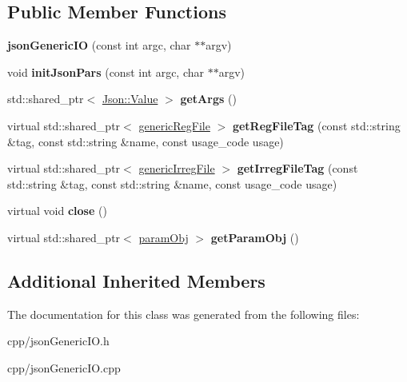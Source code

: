 \subsection*{Public Member Functions}
\begin{DoxyCompactItemize}
\item 
\mbox{\label{class_s_e_p_1_1json_generic_i_o_a7986e645bea6c00934af6705dee61dff}} 
{\bfseries json\+Generic\+IO} (const int argc, char $\ast$$\ast$argv)
\item 
\mbox{\label{class_s_e_p_1_1json_generic_i_o_a9871cce495cc8f9bcd2694a9bd79f9b9}} 
void {\bfseries init\+Json\+Pars} (const int argc, char $\ast$$\ast$argv)
\item 
\mbox{\label{class_s_e_p_1_1json_generic_i_o_abee972ad30e976b1d795b3c9bb9478e2}} 
std\+::shared\+\_\+ptr$<$ \hyperlink{class_json_1_1_value}{Json\+::\+Value} $>$ {\bfseries get\+Args} ()
\item 
\mbox{\label{class_s_e_p_1_1json_generic_i_o_a1ced300769b935d9ce658f837364f98a}} 
virtual std\+::shared\+\_\+ptr$<$ \hyperlink{class_s_e_p_1_1generic_reg_file}{generic\+Reg\+File} $>$ {\bfseries get\+Reg\+File\+Tag} (const std\+::string \&tag, const std\+::string \&name, const usage\+\_\+code usage)
\item 
\mbox{\label{class_s_e_p_1_1json_generic_i_o_afc20355c6f4e7635f3ed141a25b4c5ea}} 
virtual std\+::shared\+\_\+ptr$<$ \hyperlink{class_s_e_p_1_1generic_irreg_file}{generic\+Irreg\+File} $>$ {\bfseries get\+Irreg\+File\+Tag} (const std\+::string \&tag, const std\+::string \&name, const usage\+\_\+code usage)
\item 
\mbox{\label{class_s_e_p_1_1json_generic_i_o_a76a525c0106da7ce2950c2425af04991}} 
virtual void {\bfseries close} ()
\item 
\mbox{\label{class_s_e_p_1_1json_generic_i_o_aea2da12065714795ee9a07922930e46c}} 
virtual std\+::shared\+\_\+ptr$<$ \hyperlink{class_s_e_p_1_1param_obj}{param\+Obj} $>$ {\bfseries get\+Param\+Obj} ()
\end{DoxyCompactItemize}
\subsection*{Additional Inherited Members}


The documentation for this class was generated from the following files\+:\begin{DoxyCompactItemize}
\item 
cpp/json\+Generic\+I\+O.\+h\item 
cpp/json\+Generic\+I\+O.\+cpp\end{DoxyCompactItemize}
